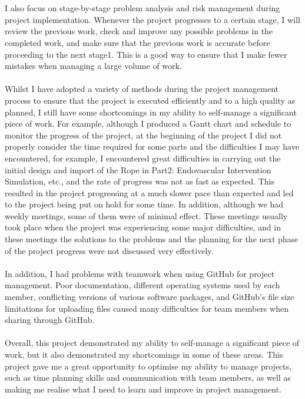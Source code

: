 \documentclass[12pt]{article}
\begin{document}
\\\\
I also focus on stage-by-stage problem analysis and risk management during project implementation. Whenever the project progresses to a certain stage, I will review the previous work, check and improve any possible problems in the completed work, and make sure that the previous work is accurate before proceeding to the next stage1. This is a good way to ensure that I make fewer mistakes when managing a large volume of work.
\\\\
Whilst I have adopted a variety of methods during the project management process to ensure that the project is executed efficiently and to a high quality as planned, I still have some shortcomings in my ability to self-manage a significant piece of work. For example, although I produced a Gantt chart and schedule to monitor the progress of the project, at the beginning of the project I did not properly consider the time required for some parts and the difficulties I may have encountered, for example, I encountered great difficulties in carrying out the initial design and import of the Rope in Part2: Endovascular Intervention Simulation, etc., and the rate of progress was not as fast as expected. This resulted in the project progressing at a much slower pace than expected and led to the project being put on hold for some time. In addition, although we had weekly meetings, some of them were of minimal effect. These meetings usually took place when the project was experiencing some major difficulties, and in these meetings the solutions to the problems and the planning for the next phase of the project progress were not discussed very effectively.
\\\\
In addition, I had problems with teamwork when using GitHub for project management. Poor documentation, different operating systems used by each member, conflicting versions of various software packages, and GitHub's file size limitations for uploading files caused many difficulties for team members when sharing through GitHub.
\\\\
Overall, this project demonstrated my ability to self-manage a significant piece of work, but it also demonstrated my shortcomings in some of these areas. This project gave me a great opportunity to optimise my ability to manage projects, such as time planning skills and communication with team members, as well as making me realise what I need to learn and improve in project management.
\end{document}

